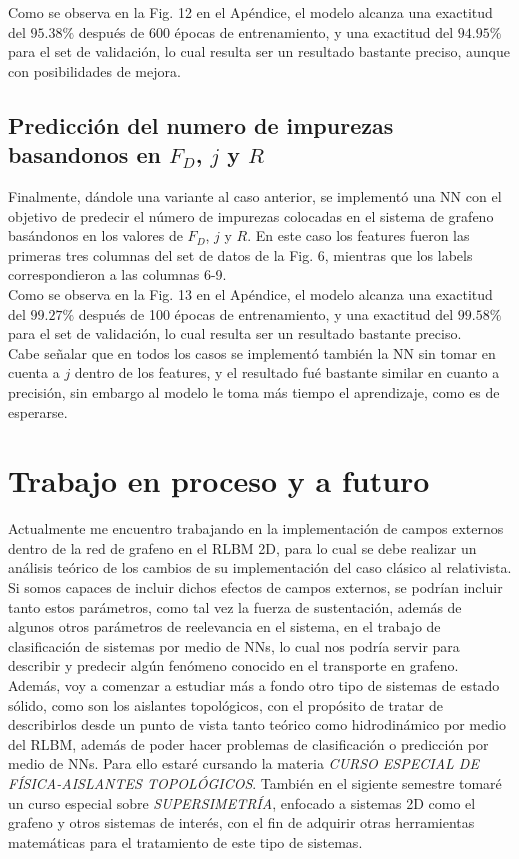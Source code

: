 \documentclass{article}
\begin{document}
Como se observa en la Fig. 12 en el Apéndice, el modelo alcanza una exactitud del $95.38\%$ después de 600 épocas de entrenamiento, y una exactitud del $94.95\%$ para el set de validación, lo cual resulta ser un resultado bastante preciso, aunque con posibilidades de mejora.

\subsection{Predicción del numero de impurezas basandonos en $F_D$, $j$ y $R$}
Finalmente, dándole una variante al caso anterior, se implementó una NN con el objetivo de predecir el número de impurezas colocadas en el sistema de grafeno basándonos en los valores de $F_D$, $j$ y $R$. En este caso los features fueron las primeras tres columnas del set de datos de la Fig. 6, mientras que los labels correspondieron a las columnas 6-9.\\ 

Como se observa en la Fig. 13 en el Apéndice, el modelo alcanza una exactitud del $99.27\%$ después de 100 épocas de entrenamiento, y una exactitud del $99.58\%$ para el set de validación, lo cual resulta ser un resultado bastante preciso.\\

Cabe señalar que en todos los casos se implementó también la NN sin tomar en cuenta a $j$ dentro de los features, y el resultado fué bastante similar en cuanto a precisión, sin embargo al modelo le toma más tiempo el aprendizaje, como es de esperarse.

\section{Trabajo en proceso y a futuro}
Actualmente me encuentro trabajando en la implementación de campos externos dentro de la red de grafeno en el RLBM 2D, para lo cual se debe realizar un análisis teórico de los cambios de su implementación del caso clásico al relativista. Si somos capaces de incluir dichos efectos de campos externos, se podrían incluir tanto estos parámetros, como tal vez la fuerza de sustentación, además de algunos otros parámetros de reelevancia en el sistema, en el trabajo de clasificación de sistemas por medio de NNs, lo cual nos podría servir para describir y predecir algún fenómeno conocido en el transporte en grafeno. Además, voy a comenzar a estudiar más a fondo otro tipo de sistemas de estado sólido, como son los aislantes topológicos, con el propósito de tratar de describirlos desde un punto de vista tanto teórico como hidrodinámico por medio del RLBM, además de poder hacer problemas de clasificación o predicción por medio de NNs. Para ello estaré cursando la materia \textit{CURSO ESPECIAL DE FÍSICA-AISLANTES TOPOLÓGICOS}. También en el sigiente semestre tomaré un curso especial sobre \textit{SUPERSIMETRÍA}, enfocado a sistemas 2D como el grafeno y otros sistemas de interés, con el fin de adquirir otras herramientas matemáticas para el tratamiento de este tipo de sistemas.  
\end{document}
